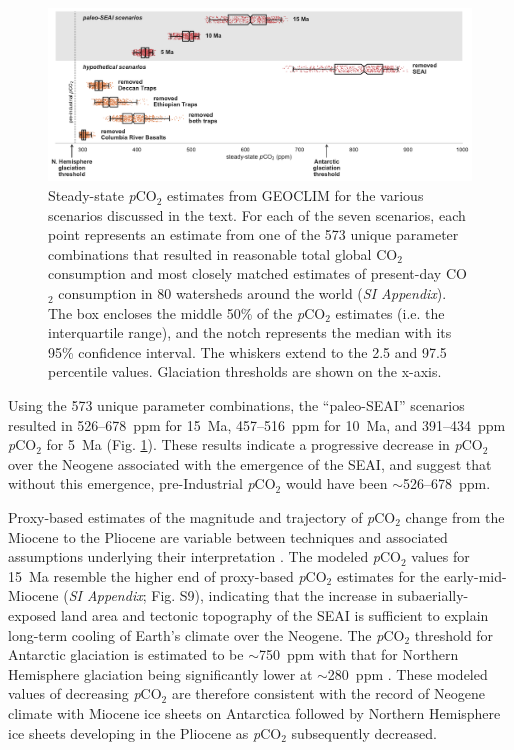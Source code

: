 \documentclass[9pt,twocolumn,twoside,lineno]{pnas-new}
\newcommand{\pCOtwo}{\textit{p}CO$_{2}$\xspace}
\newcommand{\COtwo}{CO$_{2}$\xspace}
\newcommand{\SI}{\textit{SI Appendix}\xspace}
\begin{document}
\begin{figure}[h]
    \centering
    \includegraphics[width=1\linewidth]{Figures/scenario_pCO2.pdf}
    \caption{Steady-state \pCOtwo estimates from GEOCLIM for the various scenarios discussed in the text. For each of the seven scenarios, each point represents an estimate from one of the 573 unique parameter combinations that resulted in reasonable total global \COtwo consumption and most closely matched estimates of present-day \COtwo consumption in 80 watersheds around the world (\SI). The box encloses the middle 50\% of the \pCOtwo estimates (i.e. the interquartile range), and the notch represents the median with its 95\% confidence interval. The whiskers extend to the 2.5 and 97.5 percentile values. Glaciation thresholds \cite{DeConto2008a} are shown on the x-axis.}
    \label{fig:scenario_pCO2}
\end{figure}

Using the 573 unique parameter combinations, the ``paleo-SEAI'' scenarios resulted in 526--678~ppm for 15~Ma, 457--516~ppm for 10~Ma, and 391--434~ppm \pCOtwo for 5~Ma (Fig. \ref{fig:scenario_pCO2}). These results indicate a progressive decrease in \pCOtwo over the Neogene associated with the emergence of the SEAI, and suggest that without this emergence, pre-Industrial \pCOtwo would have been $\sim$526--678~ppm.

Proxy-based estimates of the magnitude and trajectory of \pCOtwo change from the Miocene to the Pliocene are variable between techniques and associated assumptions underlying their interpretation \cite{Foster2017a}. The modeled \pCOtwo values for 15~Ma resemble the higher end of proxy-based \pCOtwo estimates for the early-mid-Miocene (\SI; Fig. S9), indicating that the increase in subaerially-exposed land area and tectonic topography of the SEAI is sufficient to explain long-term cooling of Earth's climate over the Neogene. The \pCOtwo threshold for Antarctic glaciation is estimated to be $\sim$750~ppm with that for Northern Hemisphere glaciation being significantly lower at $\sim$280~ppm \cite{DeConto2008a}. These modeled values of decreasing \pCOtwo are therefore consistent with the record of Neogene climate with Miocene ice sheets on Antarctica \cite{Sugden1995a} followed by Northern Hemisphere ice sheets developing in the Pliocene \cite{Haug2005a} as \pCOtwo subsequently decreased.
\end{document}
